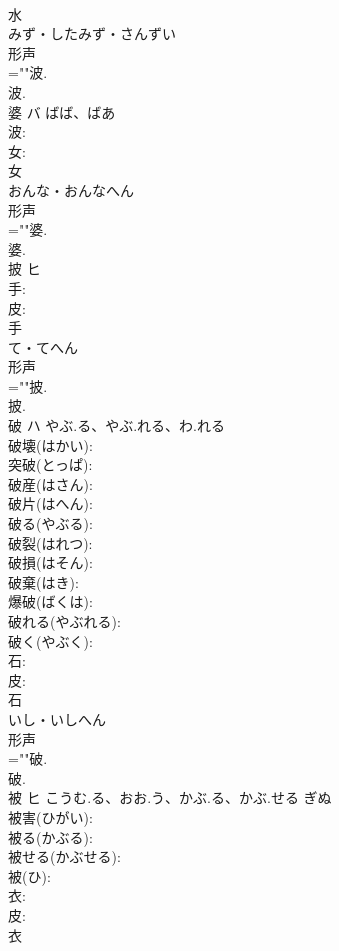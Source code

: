 \documentclass[8pt]{extreport}
\begin{document}
\begin{CJK}{UTF8}{min}
\\	水	
\\	みず・したみず・さんずい	
\\	形声 
\\	=""波.
\\	波.
\\	婆	バ	ばば、ばあ		
\\	波: 
\\	女: 
\\	女	
\\	おんな・おんなへん	
\\	形声 
\\	=""婆.
\\	婆.
\\	披	ヒ			
\\	手: 
\\	皮: 
\\	手	
\\	て・てへん	
\\	形声 
\\	=""披.
\\	披.
\\	破	ハ	やぶ.る、やぶ.れる、わ.れる		
\\	破壊(はかい): 
\\	突破(とっぱ): 
\\	破産(はさん): 
\\	破片(はへん): 
\\	破る(やぶる): 
\\	破裂(はれつ): 
\\	破損(はそん): 
\\	破棄(はき): 
\\	爆破(ばくは): 
\\	破れる(やぶれる): 
\\	破く(やぶく): 
\\	石: 
\\	皮: 
\\	石	
\\	いし・いしへん	
\\	形声 
\\	=""破.
\\	破.
\\	被	ヒ	こうむ.る、おお.う、かぶ.る、かぶ.せる	ぎぬ	
\\	被害(ひがい): 
\\	被る(かぶる): 
\\	被せる(かぶせる): 
\\	被(ひ): 
\\	衣: 
\\	皮: 
\\	衣	

\end{CJK}
\end{document}
